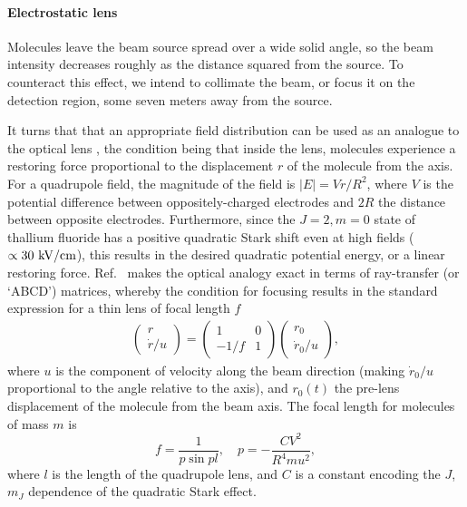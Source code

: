 \paragraph{Electrostatic lens}

Molecules leave the beam source spread over a wide solid angle, so the beam
intensity decreases roughly as the distance squared from the source. To
counteract this effect, we intend to collimate the beam, or focus it on the
detection region, some seven meters away from the source.

It turns that that an appropriate field distribution can be used as an analogue
to the optical lens \cite{cho1991tight}, the condition being that inside the
lens, molecules experience a restoring force proportional to the displacement
$r$ of the molecule from the axis. For a quadrupole field, the magnitude of the
field is $|E|=Vr/R^2$, where $V$ is the potential difference between
oppositely-charged electrodes and $2R$ the distance between opposite electrodes.
\cite{bennewitz1955fokussierung} Furthermore, since the $J=2,m=0$ state of thallium
fluoride has a positive quadratic Stark shift even at high fields
($\propto30~\mathrm{kV/cm}$), this results in the desired quadratic potential energy, or a
linear restoring force.  Ref.~\cite{berg1965determination} makes the optical
analogy exact in terms of ray-transfer (or `ABCD') matrices, whereby the
condition for focusing results in the standard expression for a thin lens of
focal length $f$
%
\begin{align*}
    \begin{pmatrix}
        r\\
        \dot r/u
    \end{pmatrix}
    =
    \begin{pmatrix}
        1&0\\
        -1/f&1
    \end{pmatrix}
    \begin{pmatrix}
        r_0\\
        \dot r_0/u
    \end{pmatrix},
\end{align*}
%
where $u$ is the component of velocity along the beam direction (making $\dot
r_0/u$ proportional to the angle relative to the axis), and $r_0(t)$ the
pre-lens displacement of the molecule from the beam axis. The focal length for
molecules of mass $m$ is \cite[cf.\ eqn~12]{berg1965determination}
%
\[
    f=\frac{1}{p\sin pl},
    \quad
    p=-\frac{CV^2}{R^4mu^2},
\]
%
where $l$ is the length of the quadrupole lens, and $C$ is a constant encoding
the $J$, $m_J$ dependence of the quadratic Stark effect.

